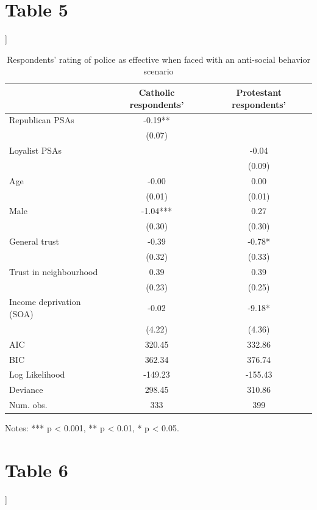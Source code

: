 \documentclass[12pt,letterpaper]{article}
\begin{document}
\section*{Table 5}
	]
	\begin{table}[htbp]
		\centering
		\caption{Respondents' rating of police as effective when faced with an anti-social behavior scenario}
		\begin{tabular}{lcc}
			\toprule
			& \textbf{Catholic respondents'} & \textbf{Protestant respondents'} \\
			\midrule
			Republican PSAs             & -0.19** & \\
			& (0.07) & \\
			Loyalist PSAs               & & -0.04 \\
			& & (0.09) \\
			Age                         & -0.00 & 0.00 \\
			& (0.01) & (0.01) \\
			Male                        & -1.04*** & 0.27 \\
			& (0.30) & (0.30) \\
			General trust               & -0.39 & -0.78* \\
			& (0.32) & (0.33) \\
			Trust in neighbourhood     & 0.39 & 0.39 \\
			& (0.23) & (0.25) \\
			Income deprivation (SOA)   & -0.02 & -9.18* \\
			& (4.22) & (4.36) \\
			\midrule
			AIC                         & 320.45 & 332.86 \\
			BIC                         & 362.34 & 376.74 \\
			Log Likelihood              & -149.23 & -155.43 \\
			Deviance                    & 298.45 & 310.86 \\
			Num. obs.                   & 333 & 399 \\
			\bottomrule
		\end{tabular}
		\label{tab:model_comparison}
		\medskip
		\small
		\raggedright
		Notes: *** p < 0.001, ** p < 0.01, * p < 0.05.
	\end{table}
	\newpage
	\section*{Table 6}
		]
	
\end{document}
